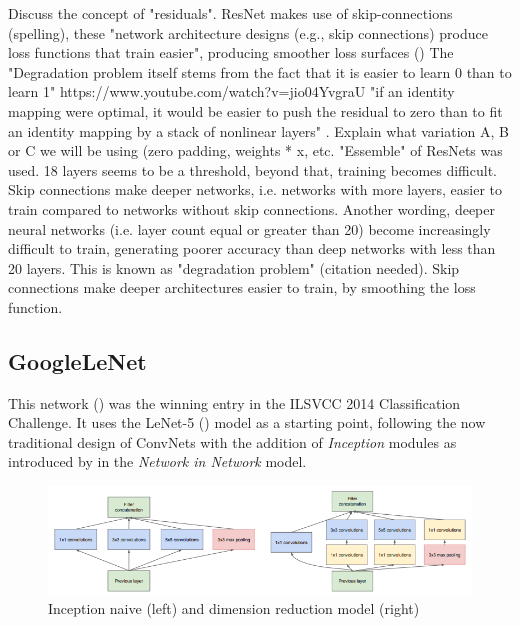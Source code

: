 Discuss the concept of "residuals". ResNet makes use of skip-connections (spelling), these "network architecture
designs (e.g., skip connections) produce loss functions that train easier", producing smoother loss surfaces (\cite{li2017visualizing})  
The "Degradation problem itself stems from the fact that it is easier to learn 0 than to learn 1"   https://www.youtube.com/watch?v=jio04YvgraU
"if an identity mapping were optimal, it would be easier to push the residual to zero than to fit an identity mapping by a stack of nonlinear layers" \cite{he2015deep}.  
Explain what variation A, B or C we will be using (zero padding, weights * x, etc.  
"Essemble" of ResNets was used.  
18 layers seems to be a threshold, beyond that, training becomes difficult. Skip connections make deeper networks, i.e. networks with more layers, easier to train compared to networks without skip connections.  
Another wording, deeper neural networks (i.e. layer count equal or greater than 20) become increasingly difficult to train, generating poorer accuracy than deep networks with less than 20 layers. This is known as "degradation problem" (citation needed). Skip connections make deeper architectures easier to train, by smoothing the loss function.

\subsection{GoogleLeNet}

This network (\cite{szegedy2014going}) was the winning entry in the ILSVCC 2014 Classification Challenge. It uses the LeNet-5 (\cite{Lecun98gradient-basedlearning}) model as a starting point, following the now traditional design of ConvNets with the addition of \textit{Inception} modules as introduced by \cite{lin2013network} in the \textit{Network in Network} model.

\begin{figure}[ht]
 \centering 
 \includegraphics[width=\columnwidth]{Figures/InceptionModules.png}
 \caption{Inception naive (left) and dimension reduction model (right)}
 \label{fig:inception_modules}
\end{figure}

